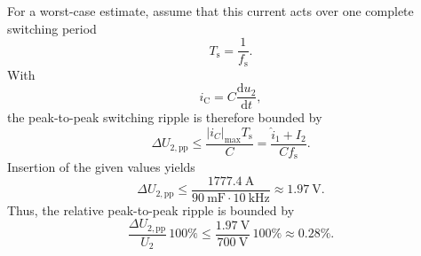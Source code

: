 \begin{solutionblock}
	For a worst-case estimate, assume that this current acts over one complete switching period
	\begin{equation*}
		T_\mathrm{s}=\frac{1}{f_\mathrm{s}}.
	\end{equation*}
	With
	\begin{equation*}
		i_\mathrm{C}=C\frac{\mathrm{d}u_{\mathrm{2}}}{\mathrm{d}t},
	\end{equation*}
	the peak-to-peak switching ripple is therefore bounded by
	\begin{equation*}
		\Delta U_{\mathrm{2,pp}}
		\leq
		\frac{|i_C|_{\max}T_\mathrm{s}}{C}
		=
		\frac{\hat i_{\mathrm{1}}+I_{\mathrm{2}}}
		{C f_\mathrm{s}}.
	\end{equation*}
	Insertion of the given values yields
	\begin{equation*}
		\Delta U_{\mathrm{2,pp}}
		\leq
		\frac{\SI{1777.4}{\ampere}}
		{\SI{90}{\milli\farad}\cdot \SI{10}{\kHz}}
		\approx \SI{1.97}{\volt}.
	\end{equation*}
	Thus, the relative peak-to-peak ripple is bounded by
	\begin{equation*}
		\frac{\Delta U_{\mathrm{2,pp}}}{U_{\mathrm{2}}}\,100\%
		\leq
		\frac{\SI{1.97}{\volt}}{\SI{700}{\volt}}\,100\%
		\approx 0.28\%.
	\end{equation*}
\end{solutionblock}
